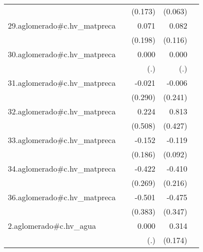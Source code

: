 {\begin{longtable}{l*{4}{D{.}{.}{-1}}}
            &                     &     (0.173)         &     (0.063)         &                     \\
\addlinespace
29.aglomerado#c.hv\_matpreca&                     &       0.071         &       0.082         &                     \\
            &                     &     (0.198)         &     (0.116)         &                     \\
\addlinespace
30.aglomerado#c.hv\_matpreca&                     &       0.000         &       0.000         &                     \\
            &                     &         (.)         &         (.)         &                     \\
\addlinespace
31.aglomerado#c.hv\_matpreca&                     &      -0.021         &      -0.006         &                     \\
            &                     &     (0.290)         &     (0.241)         &                     \\
\addlinespace
32.aglomerado#c.hv\_matpreca&                     &       0.224         &       0.813         &                     \\
            &                     &     (0.508)         &     (0.427)         &                     \\
\addlinespace
33.aglomerado#c.hv\_matpreca&                     &      -0.152         &      -0.119         &                     \\
            &                     &     (0.186)         &     (0.092)         &                     \\
\addlinespace
34.aglomerado#c.hv\_matpreca&                     &      -0.422         &      -0.410         &                     \\
            &                     &     (0.269)         &     (0.216)         &                     \\
\addlinespace
36.aglomerado#c.hv\_matpreca&                     &      -0.501         &      -0.475         &                     \\
            &                     &     (0.383)         &     (0.347)         &                     \\
\addlinespace
2.aglomerado#c.hv\_agua&                     &       0.000         &       0.314         &                     \\
            &                     &         (.)         &     (0.174)         &                     \\

\end{longtable}}
